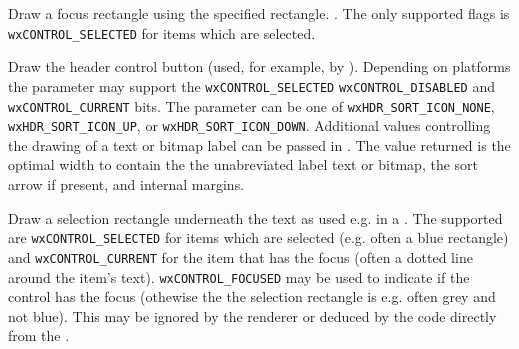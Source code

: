 \label{wxrenderernativedrawfocusrect}


Draw a focus rectangle using the specified rectangle.
. The only supported flags is 
\texttt{wxCONTROL\_SELECTED} for items which are selected.


\label{wxrenderernativedrawheaderbutton}


Draw the header control button (used, for example, by
).  Depending on platforms the
 parameter may support the \texttt{wxCONTROL\_SELECTED}
\texttt{wxCONTROL\_DISABLED} and \texttt{wxCONTROL\_CURRENT} bits.
The  parameter can be one of
\texttt{wxHDR\_SORT\_ICON\_NONE}, \texttt{wxHDR\_SORT\_ICON\_UP}, or
\texttt{wxHDR\_SORT\_ICON\_DOWN}.  Additional values controlling the
drawing of a text or bitmap label can be passed in .  The
value returned is the optimal width to contain the the unabreviated
label text or bitmap, the sort arrow if present, and internal margins.



\label{wxrenderernativedrawitemselectionrect}


Draw a selection rectangle underneath the text as used e.g. in a 
. The supported  are
\texttt{wxCONTROL\_SELECTED} for items which are selected (e.g. often a blue
rectangle) and \texttt{wxCONTROL\_CURRENT} for the item that has the focus
(often a dotted line around the item's text). \texttt{wxCONTROL\_FOCUSED} may
be used to indicate if the control has the focus (othewise the the selection
rectangle is e.g. often grey and not blue). This may be ignored by the renderer
or deduced by the code directly from the .


\label{wxrenderernativedrawpushbutton}

